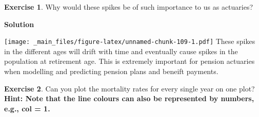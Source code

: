 \documentclass[
]{book}
\newenvironment{Shaded}{\begin{snugshade}}{\end{snugshade}}
\newcommand{\AttributeTok}[1]{\textcolor[rgb]{0.77,0.63,0.00}{#1}}
\newcommand{\DecValTok}[1]{\textcolor[rgb]{0.00,0.00,0.81}{#1}}
\newcommand{\FunctionTok}[1]{\textcolor[rgb]{0.00,0.00,0.00}{#1}}
\newcommand{\NormalTok}[1]{#1}
\newcommand{\SpecialCharTok}[1]{\textcolor[rgb]{0.00,0.00,0.00}{#1}}
\newcommand{\StringTok}[1]{\textcolor[rgb]{0.31,0.60,0.02}{#1}}
\theoremstyle{definition}
\theoremstyle{definition}
\theoremstyle{definition}
\newtheorem{exercise}{Exercise}[chapter]
\theoremstyle{definition}
\theoremstyle{remark}
\begin{document}
\begin{exercise}
Why would these spikes be of such importance to us as actuaries?
\end{exercise}

\textbf{Solution}

\begin{Shaded}
\end{Shaded}

\texttt{[image: \_main\_files/figure-latex/unnamed-chunk-109-1.pdf]}
These spikes in the different ages will drift with time and eventually cause spikes in the population at retirement age. This is extremely important for pension actuaries when modelling and predicting pension plans and beneift payments.

\begin{exercise}
Can you plot the mortality rates for every single year on one plot?
\textbf{Hint: Note that the line colours can also be represented by numbers, e.g., col = 1.}
\end{exercise}
\end{document}
